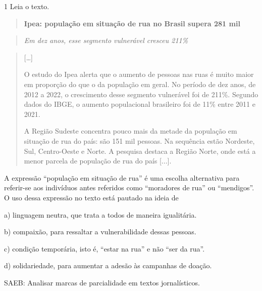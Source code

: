 

\num{1} Leia o texto.

\begin{quote}
\textbf{Ipea: população em situação de rua no Brasil supera 281 mil}
\end{quote}

\begin{quote}
\emph{Em dez anos, esse segmento vulnerável cresceu 211\%}
\end{quote}

\begin{quote}
{[}\ldots{]}

O estudo do Ipea alerta que o aumento de pessoas nas ruas é muito maior
em proporção do que o da população em geral. No período de dez anos, de
2012 a 2022, o crescimento desse segmento vulnerável foi de 211\%.
Segundo dados do IBGE, o aumento populacional brasileiro foi de 11\%
entre 2011 e 2021.

A Região Sudeste concentra pouco mais da metade da população em situação
de rua do país: são 151 mil pessoas. Na sequência estão Nordeste, Sul,
Centro-Oeste e Norte. A pesquisa destaca a Região Norte, onde está a
menor parcela de população de rua do país {[}...{]}.
\end{quote}


A expressão ``população em situação de rua'' é uma escolha alternativa
para referir-se aos indivíduos antes referidos como ``moradores de rua''
ou ``mendigos''. O uso dessa expressão no texto está pautado na ideia de

a) linguagem neutra, que trata a todos de maneira igualitária.

b) compaixão, para ressaltar a vulnerabilidade dessas pessoas.

c) condição temporária, isto é, ``estar na rua'' e não ``ser da rua''.

d) solidariedade, para aumentar a adesão às campanhas de doação.

SAEB: Analisar marcas de parcialidade em textos jornalísticos.

